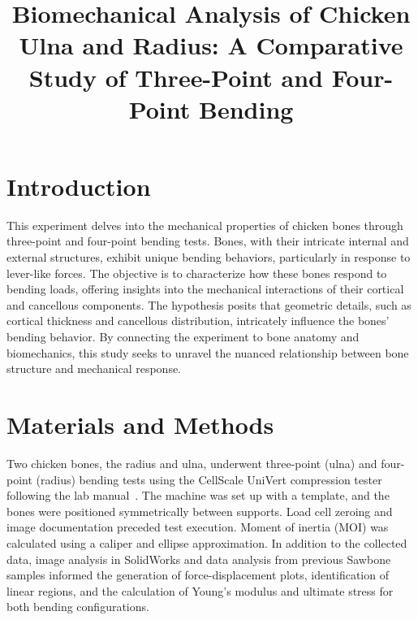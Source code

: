 \documentclass[conference, letterpaper]{IEEEtran}
\begin{document}
\title{Biomechanical Analysis of Chicken Ulna and Radius: A Comparative Study of Three-Point and Four-Point Bending}

\author{}

\maketitle

\section{Introduction}
    This experiment delves into the mechanical properties of chicken bones through three-point and four-point bending tests. Bones, with their intricate internal and external structures, exhibit unique bending behaviors, particularly in response to lever-like forces. The objective is to characterize how these bones respond to bending loads, offering insights into the mechanical interactions of their cortical and cancellous components. The hypothesis posits that geometric details, such as cortical thickness and cancellous distribution, intricately influence the bones' bending behavior. By connecting the experiment to bone anatomy and biomechanics, this study seeks to unravel the nuanced relationship between bone structure and mechanical response.

\section{Materials and Methods}
    Two chicken bones, the radius and ulna, underwent three-point (ulna) and four-point (radius) bending tests using the CellScale UniVert compression tester following the lab manual~\cite{3LM2023}. The machine was set up with a template, and the bones were positioned symmetrically between supports. Load cell zeroing and image documentation preceded test execution. Moment of inertia (MOI) was calculated using a caliper and ellipse approximation. In addition to the collected data, image analysis in SolidWorks and data analysis from previous Sawbone samples informed the generation of force-displacement plots, identification of linear regions, and the calculation of Young's modulus and ultimate stress for both bending configurations.
\end{document}
